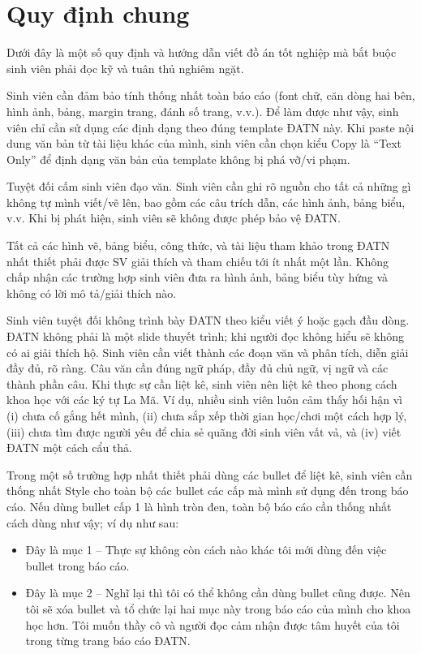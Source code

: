 \documentclass[../DoAn.tex]{subfiles}
\begin{document}
\section{Quy định chung}
Dưới đây là một số quy định và hướng dẫn viết đồ án tốt nghiệp mà bắt buộc sinh viên phải đọc kỹ và tuân thủ nghiêm ngặt.

Sinh viên cần đảm bảo tính thống nhất toàn báo cáo (font chữ, căn dòng hai bên, hình ảnh, bảng, margin trang, đánh số trang, v.v.). Để làm được như vậy, sinh viên chỉ cần sử dụng các định dạng theo đúng template ĐATN này. Khi paste nội dung văn bản từ tài liệu khác của mình, sinh viên cần chọn kiểu Copy là “Text Only” để định dạng văn bản của template không bị phá vỡ/vi phạm.

Tuyệt đối cấm sinh viên đạo văn. Sinh viên cần ghi rõ nguồn cho tất cả những gì không tự mình viết/vẽ lên, bao gồm các câu trích dẫn, các hình ảnh, bảng biểu, v.v. Khi bị phát hiện, sinh viên sẽ không được phép bảo vệ ĐATN.

Tất cả các hình vẽ, bảng biểu, công thức, và tài liệu tham khảo trong ĐATN nhất thiết phải được SV giải thích và tham chiếu tới ít nhất một lần. Không chấp nhận các trường hợp sinh viên đưa ra hình ảnh, bảng biểu tùy hứng và không có lời mô tả/giải thích nào.

Sinh viên tuyệt đối không trình bày ĐATN theo kiểu viết ý hoặc gạch đầu dòng. ĐATN không phải là một slide thuyết trình; khi người đọc không hiểu sẽ không có ai giải thích hộ. Sinh viên cần viết thành các đoạn văn và phân tích, diễn giải đầy đủ, rõ ràng. Câu văn cần đúng ngữ pháp, đầy đủ chủ ngữ, vị ngữ và các thành phần câu.
Khi thực sự cần liệt kê, sinh viên nên liệt kê theo phong cách khoa học với các ký tự La Mã. Ví dụ, nhiều sinh viên luôn cảm thấy hối hận vì (i) chưa cố gắng hết mình, (ii) chưa sắp xếp thời gian học/chơi một cách hợp lý, (iii) chưa tìm được người yêu để chia sẻ quãng đời sinh viên vất vả, và (iv) viết ĐATN một cách cẩu thả.

Trong một số trường hợp nhất thiết phải dùng các bullet để liệt kê, sinh viên cần thống nhất Style cho toàn bộ các bullet các cấp mà mình sử dụng đến trong báo cáo. Nếu dùng bullet cấp 1 là hình tròn đen, toàn bộ báo cáo cần thống nhất cách dùng như vậy; ví dụ như sau:

\begin{itemize}
\item Đây là mục 1 -- Thực sự không còn cách nào khác tôi mới dùng đến việc bullet trong báo cáo.
\item Đây là mục 2 -- Nghĩ lại thì tôi có thể không cần dùng bullet cũng được. Nên tôi sẽ xóa bullet và tổ chức lại hai mục này trong báo cáo của mình cho khoa học hơn. Tôi muốn thầy cô và người đọc cảm nhận được tâm huyết của tôi trong từng trang báo cáo ĐATN.
\end{itemize}
\end{document}
